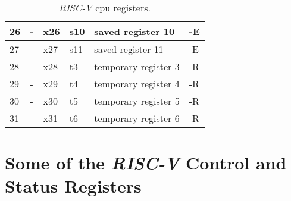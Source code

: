 \begin{table}[!ht]
{\begin{tabular}{|l|l|l|l|l|l|}
  26                                                                      & -                                                                                   & x26               & s10               & saved register 10                                                               & -E                       \\ \hline
  27                                                                      & -                                                                                   & x27               & s11               & saved register 11                                                               & -E                       \\ \hline
  28                                                                      & -                                                                                   & x28               & t3                & temporary register 3                                                            & -R                       \\ \hline
  29                                                                      & -                                                                                   & x29               & t4                & temporary register 4                                                            & -R                       \\ \hline
  30                                                                      & -                                                                                   & x30               & t5                & temporary register 5                                                            & -R                       \\ \hline
  31                                                                      & -                                                                                   & x31               & t6                & temporary register 6                                                            & -R                       \\ \hline
  \end{tabular}}
  \caption{\textit{RISC-V} \acrshort{cpu} registers.}
  \label{tab:riscv_cpu_registers}
\end{table}

\newpage

\section{Some of the \textit{RISC-V} Control and Status Registers}
\label{appendix:riscv_essencial_csr}

